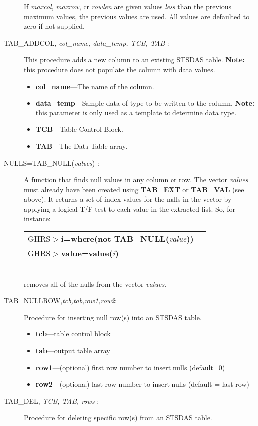 \begin{description}
	If {\it maxcol}, {\it maxrow}, or {\it rowlen} are given 
	values {\it less} than the previous maximum values, the previous
	values are used.  All values are defaulted to zero
	if not supplied.
%
\item [TAB\_ADDCOL, {\it col\_name, data\_temp, TCB, TAB} : ] This procedure adds a new
column to an existing STSDAS table.  {\bf Note:} this procedure does not 
populate the column with data values.

\begin{itemize}
\item {\bf col\_name}---The name of the column.
\item {\bf data\_temp}---Sample data of type to be written to the column.  
{\bf Note:} this parameter is only used as a template to determine data type.
\item {\bf TCB}---Table Control Block.
\item {\bf TAB}---The Data Table array.
\end{itemize}
%
\item [NULLS=TAB\_NULL({\it values}) :]
A function that finds null values in any column or row.  The 
vector {\it values} must already have been created using {\bf 
TAB\_EXT} or {\bf TAB\_VAL} (see above).  It returns a set of index 
values for the nulls in the vector by applying a logical T/F test to 
each value in the extracted list.  So, for instance:\\

\begin{tabular}{ll}
GHRS$>${\bf i=where(not TAB\_NULL(}{\it value}{\bf ))} & \\
GHRS$>${\bf value=value(}{\it i}{\bf )} & \\
\end{tabular}\\

\noindent
removes all of the nulls from the vector {\it values}.
\newpage
\item [TAB\_NULLROW,{\it tcb,tab,row1,row2}:]
Procedure for 
inserting null row(s) into an STSDAS table.

\begin{itemize} 
\item	{\bf tcb}---table control block
\item	{\bf tab}---output table array
\item	{\bf row1}---(optional) first row number to insert nulls (default=0)
\item	{\bf row2}---(optional) last row number to insert nulls (default = last row)
\end{itemize}
%
\item [TAB\_DEL, {\it TCB, TAB, rows} :]
Procedure for deleting specific row(s) from an STSDAS table.  


\end{description}
